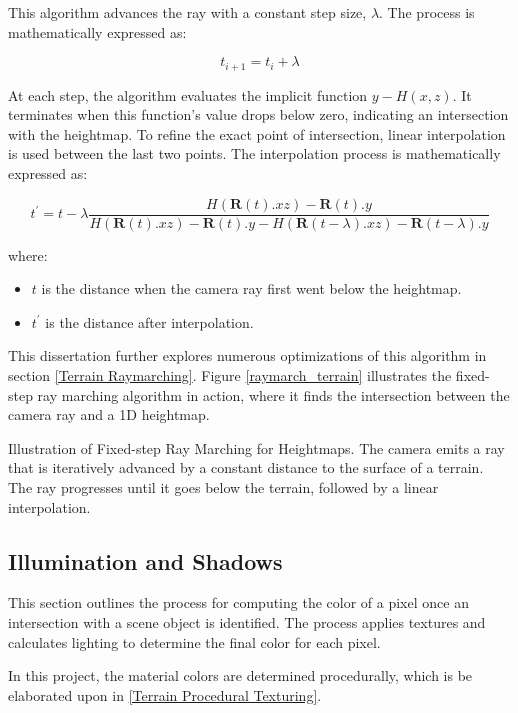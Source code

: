This algorithm advances the ray with a constant step size, $\lambda$.  The process is mathematically expressed as:

\begin{equation}
    t_{i+1} = t_{i} + \lambda
\end{equation}

At each step, the algorithm evaluates the implicit function $y-H(x,z)$. It terminates when this function's value drops below zero, indicating an intersection with the heightmap. To refine the exact point of intersection, linear interpolation is used between the last two points. The interpolation process is mathematically expressed as:

\begin{equation}
t^\prime = t - \lambda \frac{H(\mathbf{R}(t).xz) - \mathbf{R}(t).y}
    {H(\mathbf{R}(t).xz) - \mathbf{R}(t).y - H(\mathbf{R}(t - \lambda).xz) - \mathbf{R}(t - \lambda).y}
\end{equation}

where:
\begin{itemize}
    \item $t$ is the distance when the camera ray first went below the heightmap.
    \item $t^\prime$ is the distance after interpolation.
\end{itemize}

This dissertation further explores numerous optimizations of this algorithm in section \ref{Terrain Raymarching}. Figure \ref{raymarch_terrain} illustrates the fixed-step ray marching algorithm in action, where it finds the intersection between the camera ray and a 1D heightmap.

{Illustration of Fixed-step Ray Marching for Heightmaps. The camera emits a ray that is iteratively advanced by a constant distance to the surface of a terrain. The ray progresses until it goes below the terrain, followed by a linear interpolation.}


\subsection{Illumination and Shadows}

This section outlines the process for computing the color of a pixel once an intersection with a scene object is identified. The process applies textures and calculates lighting to determine the final color for each pixel.

In this project, the material colors are determined procedurally, which is be elaborated upon in \ref{Terrain Procedural Texturing}.

